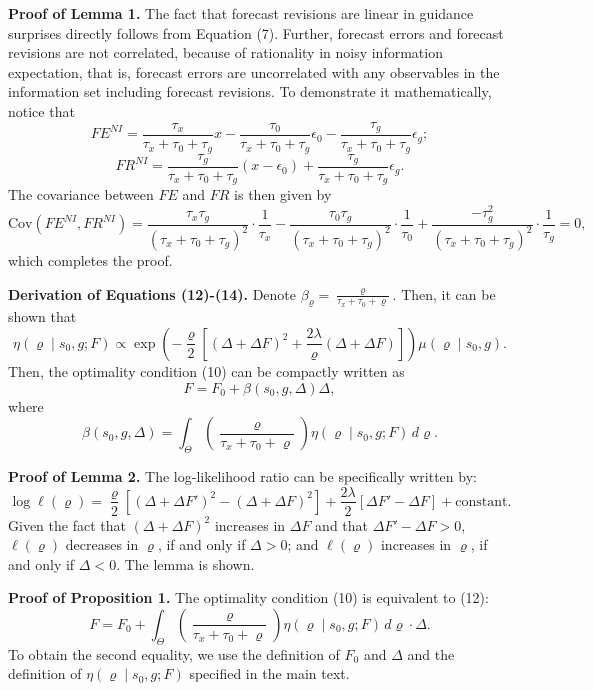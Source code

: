 \documentclass[12pt,a4paper]{article}
\newenvironment{original}
  {\par\medskip\noindent\ignorespaces}
  {\par\medskip}
\begin{document}
\begin{original}
\textbf{Proof of Lemma 1.} The fact that forecast revisions are linear in guidance surprises directly follows from Equation (7). Further, forecast errors and forecast revisions are not correlated, because of rationality in noisy information expectation, that is, forecast errors are uncorrelated with any observables in the information set including forecast revisions. To demonstrate it mathematically, notice that
\[
FE^{NI} = \frac{\tau_x}{\tau_x + \tau_0 + \tau_g} x - \frac{\tau_0}{\tau_x + \tau_0 + \tau_g} \epsilon_0 - \frac{\tau_g}{\tau_x + \tau_0 + \tau_g} \epsilon_g;
\]
\[
FR^{NI} = \frac{\tau_g}{\tau_x + \tau_0 + \tau_g} (x - \epsilon_0) + \frac{\tau_g}{\tau_x + \tau_0 + \tau_g} \epsilon_g.
\]
The covariance between $FE$ and $FR$ is then given by
\[
\text{Cov}(FE^{NI}, FR^{NI}) = \frac{\tau_x \tau_g}{(\tau_x + \tau_0 + \tau_g)^2} \cdot \frac{1}{\tau_x} - \frac{\tau_0 \tau_g}{(\tau_x + \tau_0 + \tau_g)^2} \cdot \frac{1}{\tau_0} + \frac{-\tau_g^2}{(\tau_x + \tau_0 + \tau_g)^2} \cdot \frac{1}{\tau_g} = 0,
\]
which completes the proof.

\textbf{Derivation of Equations (12)-(14).} Denote $\beta_\varrho = \frac{\varrho}{\tau_x + \tau_0 + \varrho}$. Then, it can be shown that
\[
\eta(\varrho \mid s_0, g; F) \propto \exp\!\left(-\frac{\varrho}{2}\left[(\Delta + \Delta F)^2 + \frac{2\lambda}{\varrho}(\Delta + \Delta F)\right]\right) \mu(\varrho \mid s_0, g).
\]
Then, the optimality condition (10) can be compactly written as
\[
F = F_0 + \beta(s_0, g, \Delta) \Delta,
\]
where
\[
\beta(s_0, g, \Delta) = \int_{\Theta} \left( \frac{\varrho}{\tau_x + \tau_0 + \varrho} \right) \eta(\varrho \mid s_0, g; F) \, d\varrho.
\]

\textbf{Proof of Lemma 2.} The log-likelihood ratio can be specifically written by:
\[
\log \ell(\varrho) = \frac{\varrho}{2}[(\Delta + \Delta F')^2 - (\Delta + \Delta F)^2] + \frac{2\lambda}{2}[\Delta F' - \Delta F] + \text{constant}.
\]
Given the fact that $(\Delta + \Delta F)^2$ increases in $\Delta F$ and that $\Delta F' - \Delta F > 0$, $\ell(\varrho)$ decreases in $\varrho$, if and only if $\Delta > 0$; and $\ell(\varrho)$ increases in $\varrho$, if and only if $\Delta < 0$. The lemma is shown.

\textbf{Proof of Proposition 1.} The optimality condition (10) is equivalent to (12):
\[
F = F_0 + \int_{\Theta} \left( \frac{\varrho}{\tau_x + \tau_0 + \varrho} \right) \eta(\varrho \mid s_0, g; F) \, d\varrho \cdot \Delta. \tag{B.1}
\]
To obtain the second equality, we use the definition of $F_0$ and $\Delta$ and the definition of $\eta(\varrho \mid s_0, g; F)$ specified in the main text.


\end{original}
\end{document}

